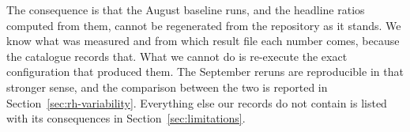 The consequence is that the August baseline runs, and the headline
ratios computed from them, cannot be regenerated from the repository
as it stands. We know what was measured and from which
result file each number comes, because the catalogue records that. What
we cannot do is re-execute the exact configuration that produced them.
The September reruns are reproducible in that stronger sense, and the
comparison between the two is reported in
Section~\ref{sec:rh-variability}. Everything else our records do not
contain is listed with its consequences in Section~\ref{sec:limitations}.

